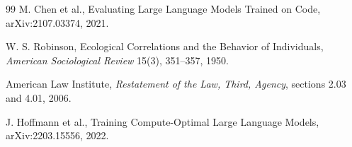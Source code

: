 \documentclass[11pt]{article}
\theoremstyle{definition}
\theoremstyle{remark}
\begin{document}
\begin{thebibliography}{99}
M. Chen et al., Evaluating Large Language Models Trained on Code, arXiv:2107.03374, 2021.

W. S. Robinson, Ecological Correlations and the Behavior of Individuals, \textit{American Sociological Review} 15(3), 351--357, 1950.

American Law Institute, \textit{Restatement of the Law, Third, Agency}, sections 2.03 and 4.01, 2006.

J. Hoffmann et al., Training Compute-Optimal Large Language Models, arXiv:2203.15556, 2022.

\end{thebibliography}
\end{document}

